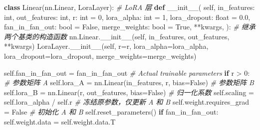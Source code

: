 \documentclass[
]{article}
\newenvironment{Shaded}{}{}
\newcommand{\BuiltInTok}[1]{\textcolor[rgb]{0.00,0.50,0.00}{#1}}
\newcommand{\CommentTok}[1]{\textcolor[rgb]{0.38,0.63,0.69}{\textit{#1}}}
\newcommand{\ControlFlowTok}[1]{\textcolor[rgb]{0.00,0.44,0.13}{\textbf{#1}}}
\newcommand{\DecValTok}[1]{\textcolor[rgb]{0.25,0.63,0.44}{#1}}
\newcommand{\FloatTok}[1]{\textcolor[rgb]{0.25,0.63,0.44}{#1}}
\newcommand{\FunctionTok}[1]{\textcolor[rgb]{0.02,0.16,0.49}{#1}}
\newcommand{\KeywordTok}[1]{\textcolor[rgb]{0.00,0.44,0.13}{\textbf{#1}}}
\newcommand{\NormalTok}[1]{#1}
\newcommand{\OperatorTok}[1]{\textcolor[rgb]{0.40,0.40,0.40}{#1}}
\newcommand{\VariableTok}[1]{\textcolor[rgb]{0.10,0.09,0.49}{#1}}
\begin{document}
\begin{Shaded}
\begin{Highlighting}[]
\KeywordTok{class}\NormalTok{ Linear(nn.Linear, LoraLayer):}
    \CommentTok{\# LoRA 层}
    \KeywordTok{def} \FunctionTok{\_\_init\_\_}\NormalTok{(}
        \VariableTok{self}\NormalTok{,}
\NormalTok{        in\_features: }\BuiltInTok{int}\NormalTok{,}
\NormalTok{        out\_features: }\BuiltInTok{int}\NormalTok{,}
\NormalTok{        r: }\BuiltInTok{int} \OperatorTok{=} \DecValTok{0}\NormalTok{,}
\NormalTok{        lora\_alpha: }\BuiltInTok{int} \OperatorTok{=} \DecValTok{1}\NormalTok{,}
\NormalTok{        lora\_dropout: }\BuiltInTok{float} \OperatorTok{=} \FloatTok{0.0}\NormalTok{,}
\NormalTok{        fan\_in\_fan\_out: }\BuiltInTok{bool} \OperatorTok{=} \VariableTok{False}\NormalTok{, }
\NormalTok{        merge\_weights: }\BuiltInTok{bool} \OperatorTok{=} \VariableTok{True}\NormalTok{,}
        \OperatorTok{**}\NormalTok{kwargs,}
\NormalTok{    ):}
        \CommentTok{\# 继承两个基类的构造函数}
\NormalTok{        nn.Linear.}\FunctionTok{\_\_init\_\_}\NormalTok{(}\VariableTok{self}\NormalTok{, in\_features, out\_features, }\OperatorTok{**}\NormalTok{kwargs)}
\NormalTok{        LoraLayer.}\FunctionTok{\_\_init\_\_}\NormalTok{(}\VariableTok{self}\NormalTok{, r}\OperatorTok{=}\NormalTok{r, lora\_alpha}\OperatorTok{=}\NormalTok{lora\_alpha, lora\_dropout}\OperatorTok{=}\NormalTok{lora\_dropout, merge\_weights}\OperatorTok{=}\NormalTok{merge\_weights)}

        \VariableTok{self}\NormalTok{.fan\_in\_fan\_out }\OperatorTok{=}\NormalTok{ fan\_in\_fan\_out}
        \CommentTok{\# Actual trainable parameters}
        \ControlFlowTok{if}\NormalTok{ r }\OperatorTok{\textgreater{}} \DecValTok{0}\NormalTok{:}
            \CommentTok{\# 参数矩阵 A}
            \VariableTok{self}\NormalTok{.lora\_A }\OperatorTok{=}\NormalTok{ nn.Linear(in\_features, r, bias}\OperatorTok{=}\VariableTok{False}\NormalTok{)}
            \CommentTok{\# 参数矩阵 B}
            \VariableTok{self}\NormalTok{.lora\_B }\OperatorTok{=}\NormalTok{ nn.Linear(r, out\_features, bias}\OperatorTok{=}\VariableTok{False}\NormalTok{)}
            \CommentTok{\# 归一化系数}
            \VariableTok{self}\NormalTok{.scaling }\OperatorTok{=} \VariableTok{self}\NormalTok{.lora\_alpha }\OperatorTok{/} \VariableTok{self}\NormalTok{.r}
            \CommentTok{\# 冻结原参数，仅更新 A 和 B}
            \VariableTok{self}\NormalTok{.weight.requires\_grad }\OperatorTok{=} \VariableTok{False}
        \CommentTok{\# 初始化 A 和 B}
        \VariableTok{self}\NormalTok{.reset\_parameters()}
        \ControlFlowTok{if}\NormalTok{ fan\_in\_fan\_out:}
            \VariableTok{self}\NormalTok{.weight.data }\OperatorTok{=} \VariableTok{self}\NormalTok{.weight.data.T}
\end{Highlighting}
\end{Shaded}
\end{document}

